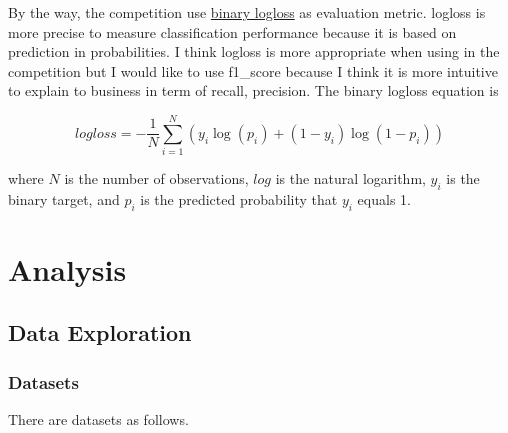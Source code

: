 \documentclass[11pt]{article}
\begin{document}
By the way, the competition use
\href{https://www.kaggle.com/c/kkbox-churn-prediction-challenge\#evaluation}{binary
logloss} as evaluation metric. logloss is more precise to measure
classification performance because it is based on prediction in
probabilities. I think logloss is more appropriate when using in the
competition but I would like to use f1\_score because I think it is more
intuitive to explain to business in term of recall, precision. The
binary logloss equation is

\[ log loss = -\frac{1}{N}\sum_{i=1}^N {(y_i\log(p_i) + (1 - y_i)\log(1 - p_i))} \]

where $N$ is the number of observations, $log$ is the natural logarithm,
$y_{i}$ is the binary target, and $p_{i}$ is the predicted probability
that $y_{i}$ equals 1.

\section{Analysis}\label{analysis}

\subsection{Data Exploration}\label{data-exploration}

\subsubsection{Datasets}\label{datasets}

There are datasets as follows.
\end{document}
